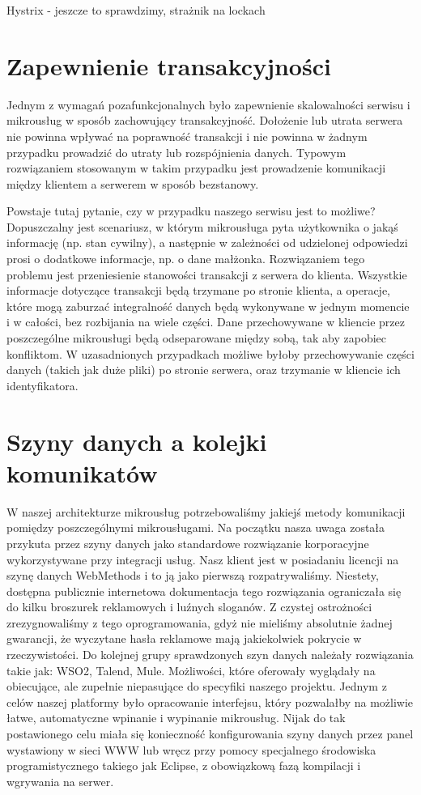 \documentclass[licencjacka]{pracamgr}
\begin{document}
Hystrix - jeszcze to sprawdzimy, strażnik na lockach %

\section{Zapewnienie transakcyjności}

Jednym z wymagań pozafunkcjonalnych było zapewnienie skalowalności serwisu i mikrousług w sposób zachowujący transakcyjność.
Dołożenie lub utrata serwera nie powinna wpływać na poprawność transakcji i nie powinna w żadnym przypadku
prowadzić do utraty lub rozspójnienia danych. Typowym rozwiązaniem stosowanym w takim przypadku jest prowadzenie
komunikacji między klientem a serwerem w sposób bezstanowy.

Powstaje tutaj pytanie, czy w przypadku naszego serwisu jest to możliwe? Dopuszczalny jest scenariusz, w którym
mikrousługa pyta użytkownika o jakąś informację (np. stan cywilny), a następnie w zależności od udzielonej odpowiedzi
prosi o dodatkowe informacje, np. o dane małżonka. Rozwiązaniem tego problemu jest przeniesienie stanowości
transakcji z serwera do klienta. Wszystkie informacje dotyczące transakcji będą trzymane po stronie klienta, a
operacje, które mogą zaburzać integralność danych będą wykonywane w jednym momencie i w całości, bez rozbijania
na wiele części. Dane przechowywane w kliencie przez poszczególne mikrousługi będą odseparowane między sobą, tak aby
zapobiec konfliktom. W uzasadnionych przypadkach możliwe byłoby przechowywanie części danych (takich jak duże pliki)
po stronie serwera, oraz trzymanie w kliencie ich identyfikatora.

\section{Szyny danych a kolejki komunikatów}

W naszej architekturze mikrousług potrzebowaliśmy jakiejś metody komunikacji pomiędzy poszczególnymi mikrousługami.
Na początku nasza uwaga została przykuta przez szyny danych jako standardowe rozwiązanie korporacyjne wykorzystywane
przy integracji usług. Nasz klient jest w posiadaniu licencji na szynę danych WebMethods i to ją jako pierwszą
rozpatrywaliśmy. Niestety, dostępna publicznie internetowa dokumentacja tego rozwiązania ograniczała się do kilku
broszurek reklamowych i luźnych sloganów. Z czystej ostrożności zrezygnowaliśmy z tego oprogramowania, gdyż nie
mieliśmy absolutnie żadnej gwarancji, że wyczytane hasła reklamowe mają jakiekolwiek pokrycie w rzeczywistości.
Do kolejnej grupy sprawdzonych szyn danych należały rozwiązania takie jak: WSO2, Talend, Mule. Możliwości, które
oferowały wyglądały na obiecujące, ale zupełnie niepasujące do specyfiki naszego projektu. Jednym z celów naszej
platformy było opracowanie interfejsu, który pozwalałby na możliwie łatwe, automatyczne wpinanie i wypinanie
mikrousług. Nijak do tak postawionego celu miała się konieczność konfigurowania szyny danych przez panel wystawiony w sieci
WWW lub wręcz przy pomocy specjalnego środowiska programistycznego takiego jak Eclipse, z obowiązkową fazą kompilacji
i wgrywania na serwer. 
\end{document}
